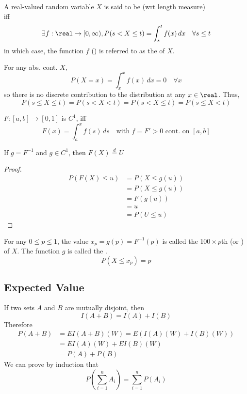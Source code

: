 \documentclass[11pt]{article}
\numberwithin{equation}{section}
\begin{document}
A real-valued random variable $X$ is said to be  (wrt length measure)\\
iff\\
\begin{equation}
	\exists f: \real \rightarrow [0, \infty), P(s < X \leq t) = \int_s^t f(x)\,dx \quad \forall s \leq t
\end{equation}
in which case, the function $f$ () is referred to as the  of $X$.

\remark
For any abs. cont. $X$, 
\begin{equation}
	P(X = x) = \int_x^x f(x) \, dx = 0 \quad \forall x
\end{equation}
so there is no discrete contribution to the distribution at any $x \in \real$.
Thus,
$$P(s \leq X \leq t) = P(s < X < t) = P(s < X \leq t) = P(s \leq X < t)$$

\proposition
$F: [a,b] \rightarrow [0, 1]$ is $C^1$, iff
$$F(x) = \int_a^x f(s) \, ds \quad \text{with } f = F' > 0 \text{ cont. on } [a, b]$$ 

\proposition If $g = F^{-1}$ and $g \in C^1$, then $F(X) \overset{d}{=} U$
\begin{proof}
	\begin{align*}
		P(F(X) \leq u) &= P(X \leq g(u)) \\
		&= P(X \leq g(u)) \\
		&= F(g(u)) \\
		&= u \\
		&= P(U \leq u)
	\end{align*}
\end{proof}

For any $0 \leq p \leq 1$, the value $x_p = g(p) = F^{-1}(p)$ is called the $100 \times p$th  (or ) of $X$. The function $g$ is called the .
\begin{equation}
	P(X \leq x_p) = p
\end{equation}

\subsection{Expected Value}
If two sets $A$ and $B$ are mutually disjoint, then
\begin{equation}
	I(A + B) = I(A) + I(B)
\end{equation}
Therefore
\begin{align}
	P(A+B) &= EI(A + B)(W) = E(I(A)(W) + I(B)(W)) \\
	&= EI(A)(W) + EI(B)(W) \\
	&= P(A) + P(B)	
\end{align}
We can prove by induction that
\begin{equation}
	P\left(\sum_{i=1}^n A_i \right) = \sum_{i=1}^n P(A_i)
\end{equation}
\end{document}
